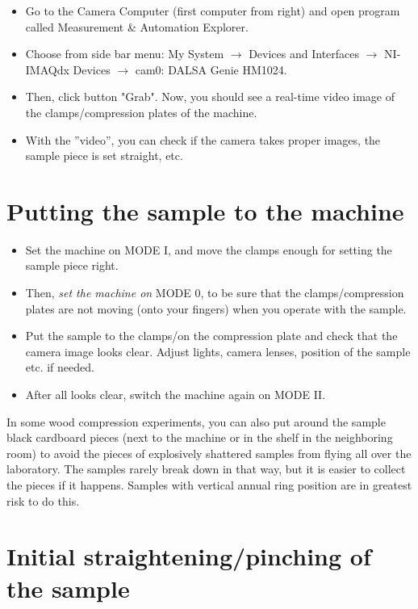 \documentclass[a4paper]{article}
\begin{document}
\begin{itemize}
  \item Go to the Camera Computer (first computer from right) and open program called Measurement \& Automation Explorer.
  \item Choose from side bar menu: My System $\rightarrow$ Devices and Interfaces $\rightarrow$ NI-IMAQdx Devices $\rightarrow$ cam0: DALSA Genie HM1024.
  \item Then, click button "Grab". Now, you should see a real-time video image of the clamps/compression plates of the machine.
  \item With the ''video'', you can check if the camera takes proper images, the sample piece is set straight, etc.
\end{itemize}

\section{Putting the sample to the machine}

\begin{itemize}
  \item Set the machine on \textsf{MODE I}, and move the clamps enough for setting the sample piece right.
  \item Then, \textit{set the machine on} \textsf{MODE 0}, to be sure that the clamps/compression plates are not moving (onto your fingers) when you operate with the sample.
  \item Put the sample to the clamps/on the compression plate and check that the camera image looks clear. Adjust lights, camera lenses, position of the sample etc. if needed.
  \item After all looks clear, switch the machine again on \textsf{MODE II}.
\end{itemize}

In some wood compression experiments, you can also put around the sample 
black cardboard pieces (next to the machine or in the shelf in the neighboring 
room) to avoid the pieces of explosively shattered samples from flying all 
over the laboratory. The samples rarely break down in that way, but it is 
easier to collect the pieces if it happens. Samples with vertical annual ring 
position are in greatest risk to do this.

\section{Initial straightening/pinching of the sample} 
\end{document}
